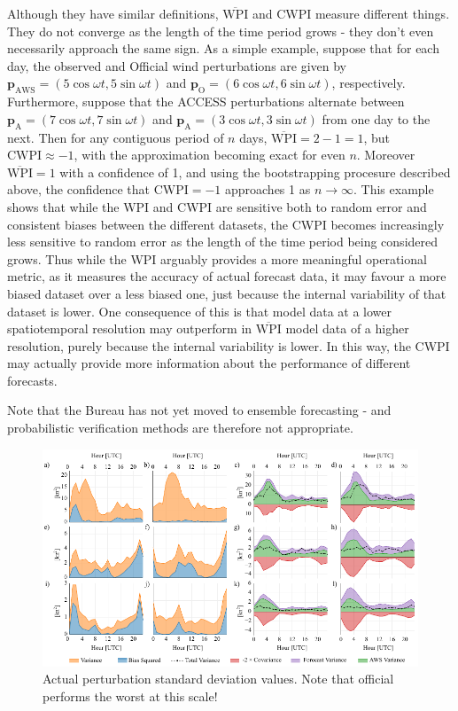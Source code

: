 \documentclass[alpha-refs]{wiley-article}
\begin{document}
Although they have similar definitions, $\overline{\text{WPI}}$ and CWPI measure different things. They do not converge as the length of the time period grows - they don't even necessarily approach the same sign. As a simple example, suppose that for each day, the observed and Official wind perturbations are given by $\boldsymbol{p}_{\text{AWS}} = \left(5\cos\omega t , 5\sin\omega t\right)$ and $\boldsymbol{p}_\text{O} = \left(6\cos\omega t , 6\sin\omega t\right)$, respectively. Furthermore, suppose that the ACCESS perturbations alternate between $\boldsymbol{p}_{\text{A}} = \left(7\cos\omega t , 7\sin\omega t\right)$ and $\boldsymbol{p}_{\text{A}} = \left(3\cos\omega t , 3\sin\omega t\right)$ from one day to the next. Then for any contiguous period of $n$ days, $\overline{\text{WPI}} = 2 - 1 = 1$, but $\text{CWPI} \approx -1$, with the approximation becoming exact for even $n$. Moreover $\overline{\text{WPI}}=1$ with a confidence of 1, and using the bootstrapping procesure described above, the confidence that $\text{CWPI} = -1$ approaches 1 as $n\to \infty$. This example shows that while the WPI and CWPI are sensitive both to random error and consistent biases between the different datasets, the CWPI becomes increasingly less sensitive to random error as the length of the time period being considered grows. Thus while the WPI arguably provides a more meaningful operational metric, as it measures the accuracy of actual forecast data, it may favour a more biased dataset over a less biased one, just because the internal variability of that dataset is lower. One consequence of this is that model data at a lower spatiotemporal resolution may outperform in $\overline{\text{WPI}}$ model data of a higher resolution, purely because the internal variability is lower. In this way, the CWPI may actually provide more information about the performance of different forecasts.

Note that the Bureau has not yet moved to ensemble forecasting - and probabilistic verification methods are therefore not appropriate. 

\begin{figure}
\centering
\includegraphics{error_decomp.pdf}
\caption{Actual perturbation standard deviation values. Note that official performs the worst at this scale!}
\label{Fig:error_decomp}
\end{figure}
\end{document}
